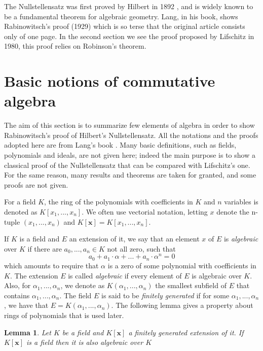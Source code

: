 \documentclass[a4paper,12pt,oneside]{book}
\newtheorem{lemma}[theorem]{Lemma}
\begin{document}
The Nullstellensatz was first proved by Hilbert \cite{Hilbert} in 1892 , and is widely known to be a fundamental theorem for algebraic geometry. Lang, in his book,  shows Rabinowitsch's proof (1929) which is so terse that the original article \cite{Rabin} consists only of one page. 
In the second section we see the proof proposed by Lifschitz \cite{lifschitz} in 1980, this proof relies on Robinson's theorem.%



\section{Basic notions of commutative algebra}
The aim of this section is to summarize few elements of algebra in order to show  Rabinowitsch's proof of  Hilbert's Nullstellensatz. All the notations and the proofs adopted here are from Lang's book \cite{Lang}. Many basic definitions, such as fields, polynomials and ideals, are not given here; indeed the main purpose is to show a classical proof of the Nullstellensatz that can be compared with Lifschitz's one.
For the same reason, many results and theorems are taken for granted, and some proofs are not given.




For a field $K$, the ring of the polynomials with coefficients in $K$ and $n$ variables is denoted as $K[x_1,...,x_n ]$. We often use vectorial notation, letting  $x$ denote the n-tuple $(x_1,...,x_n)$ and $K[\mathbf{x}]= K[x_1,...,x_n ] $.


If $K$ is a field and $E$ an extension of it, we say that an element $x$ of $E$ is \textit{algebraic} over $K$ if there are $a_0, ..., a_n\in K$ not all zero, such that
$$ a_0 + a_1 \cdot \alpha + ...+ a_n \cdot \alpha^n=0 $$ 
which amounts to require that $\alpha$  is a zero of some polynomial with coefficients in $K$. The extension $E$ is called \textit{algebraic} if every element of $E$ is algebraic over $K$. 
Also, for $\alpha_1, ...,\alpha_n $, we denote as $K(\alpha_1, ...,\alpha_n) $ the smallest subfield of $E$ that contains $\alpha_1, ...,\alpha_n$. The field $E$ is said to be \textit{finitely generated} if for some $\alpha_1, ...,\alpha_n$, we have that $E=K(\alpha_1, ...,\alpha_n)$. 
The following lemma gives a property about rings of polynomials that is used later.
\begin{lemma}\label{finit_gen}
Let $K$ be a field and $K[\mathbf{x}]$ a finitely generated extension of it. If $K[\mathbf{x}]$ is a field then it is also algebraic over $K$
\end{lemma}
\end{document}

